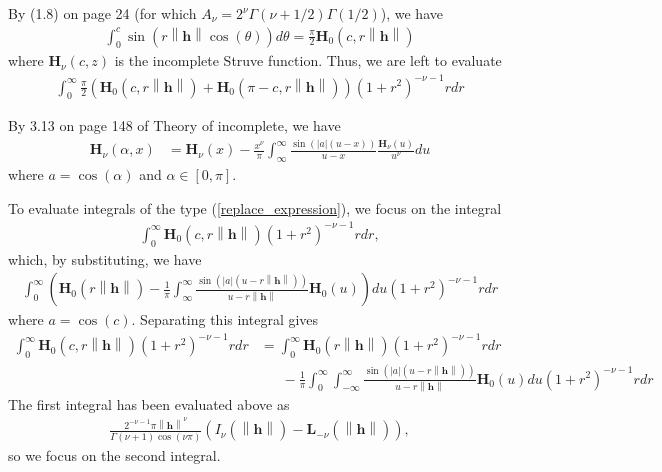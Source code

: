 \documentclass[11pt]{article}
\newcommand{\rh}{r\left\lVert \boldsymbol{h}\right\rVert}
\begin{document}
By (1.8) on page 24 (for which $A_\nu =2^\nu \Gamma(\nu+1/2)\Gamma(1/2)$), we have \begin{align*}
 \int_0^{c}  \sin(r\left\lVert \boldsymbol{h}\right\rVert \cos(\theta)) d\theta= \frac{\pi}{2} \boldsymbol{H}_{0}(c, r\left\lVert \boldsymbol{h}\right\rVert)
 \end{align*}where $\boldsymbol{H}_{\nu}(c, z)$ is the incomplete Struve function. Thus, we are left to evaluate \begin{align} 
 \int_0^\infty \frac{\pi}{2}\left(\boldsymbol{H}_{0}(c, r\left\lVert \boldsymbol{h}\right\rVert) + \boldsymbol{H}_{0}(\pi - c, r\left\lVert \boldsymbol{h}\right\rVert)\right) (1+r^2)^{-\nu-1} r dr\label{replace_expression}
 \end{align}
 

By 3.13 on page 148 of Theory of incomplete, we have \begin{align*}
  \boldsymbol{H}_\nu(\alpha, x) &= \boldsymbol{H}_\nu(x) - \frac{x^\nu}{\pi} \int_{\infty}^\infty \frac{\sin(|a|(u-x))}{u-x}\frac{\boldsymbol{H}_\nu(u)}{u^\nu} du
\end{align*}where $a = \cos(\alpha)$ and $\alpha \in [0, \pi]$.

To evaluate integrals of the type (\ref{replace_expression}), we focus on the integral \begin{align*}
 \int_0^\infty \boldsymbol{H}_{0}(c, r\left\lVert \boldsymbol{h}\right\rVert) (1+r^2)^{-\nu-1} r dr,
\end{align*}which, by substituting, we have \begin{align*}
\int_0^\infty 
\left(\boldsymbol{H}_0(\rh) - \frac{1}{\pi} \int_{\infty}^\infty \frac{\sin(|a|(u-\rh))}{u-\rh}\boldsymbol{H}_0(u) \right) du (1+r^2)^{-\nu-1} r dr
\end{align*}where $a = \cos(c)$. Separating this integral gives \begin{align*}
 \int_0^\infty \boldsymbol{H}_{0}(c, r\left\lVert \boldsymbol{h}\right\rVert) (1+r^2)^{-\nu-1} r dr &= \int_0^\infty\boldsymbol{H}_0(\rh)(1+r^2)^{-\nu - 1}rdr\\ & \ \ \ \ \ \ \ - \frac{1}{\pi}\int_0^\infty\int_{-\infty}^\infty \frac{\sin(|a|(u-\rh))}{u-\rh}\boldsymbol{H}_0(u) du(1+ r^2)^{-\nu-1}rdr
\end{align*}
The first integral has been evaluated above as \begin{align*}
\frac{2^{-\nu -1} \pi \left\lVert \boldsymbol{h}\right\rVert^{\nu}}{\Gamma(\nu+1) \cos(\nu \pi)} \left( I_{\nu }(\left\lVert \boldsymbol{h}\right\rVert) - \boldsymbol{L}_{-\nu} (\left\lVert \boldsymbol{h}\right\rVert)\right),
\end{align*}so we focus on the second integral. 
\end{document}
